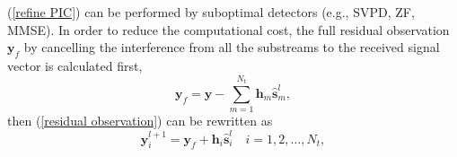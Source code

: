 (\ref{refine PIC}) can be performed by suboptimal detectors (e.g., SVPD, ZF, MMSE). In order to reduce the computational cost, the full residual observation $\mathbf{y}_{f}$ by cancelling the interference from all the substreams to the received signal vector is calculated first,
\begin{equation}
\mathbf{y}_{f}=\mathbf{y}-\sum_{m=1}^{N_{t}}\mathbf{h}_{m}\hat{\mathbf{s}}^{l}_{m},
\label{full residual observation}
\end{equation}  
then (\ref{residual observation}) can be rewritten as 
\begin{equation}
\mathbf{y}^{l+1}_{i}=\mathbf{y}_{f}+\mathbf{h}_{i}\hat{\mathbf{s}}^{l}_{i} \quad i=1,2,\ldots, N_{t},
\label{residual observation 2}
\end{equation}
